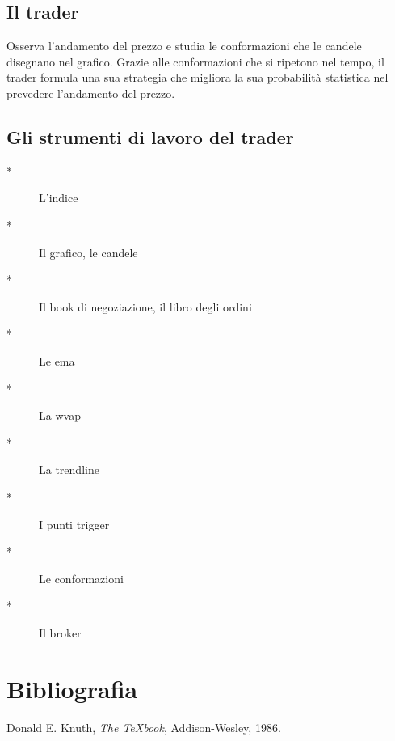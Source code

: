 \documentclass[12pt]{book}
\begin{document}
\section*{Il trader} 
Osserva l'andamento del prezzo e studia le conformazioni che le candele disegnano nel grafico. Grazie alle conformazioni che si ripetono nel tempo, il trader formula una sua strategia che migliora la sua probabilità statistica nel prevedere l'andamento del prezzo.

\section*{Gli strumenti di lavoro del trader}
\begin{description}
    \item[*] L'indice
    \item[*] Il grafico, le candele
    \item[*] Il book di negoziazione, il libro degli ordini
    \item[*] Le ema
    \item[*] La wvap
    \item[*] La trendline
    \item[*] I punti trigger
    \item[*] Le conformazioni
    \item[*] Il broker
\end{description}








\newpage
\chapter*{Bibliografia}
\begin{thebibliography}{9}
 Donald E. Knuth, \textit{The TeXbook}, Addison-Wesley, 1986.
\end{thebibliography}
\end{document}

